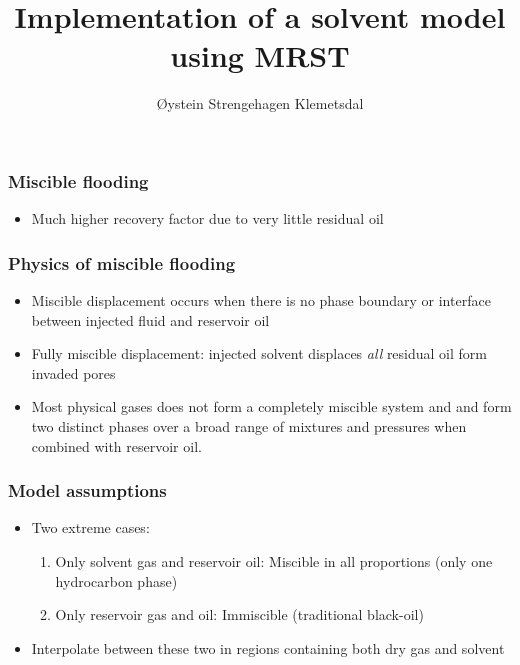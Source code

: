 \documentclass[screen, aspectratio=43]{beamer}
\title[Short title]{Implementation of a solvent model using MRST}
\author[Ø.S. Klemetsdal]{Øystein Strengehagen Klemetsdal}
\institute[NTNU]{Department of Mathematical sciences, NTNU}
\date{} %
\begin{document}
\ntnutitlepage

\begin{frame}
  \frametitle{Miscible flooding}
  \begin{itemize}
  \item Much higher recovery factor due to very little residual oil  
  \end{itemize}
\end{frame}

\begin{frame}
  \frametitle{Physics of miscible flooding}
  \begin{itemize}
  \item Miscible displacement occurs when there is no phase boundary or
    interface between injected fluid and reservoir oil
  \item Fully miscible displacement: injected solvent displaces \emph{all}
    residual oil form invaded pores
  \item Most physical gases does not form a completely miscible system and and
    form two distinct phases over a broad range of mixtures and pressures when
    combined with reservoir oil.
  \end{itemize}
\end{frame}

\begin{frame}
  \frametitle{Model assumptions}
  \begin{itemize}
  \item Two extreme cases:
    \begin{enumerate}
    \item Only solvent gas and reservoir oil: Miscible in all proportions (only
      one hydrocarbon phase)
    \item Only reservoir gas and oil: Immiscible (traditional black-oil)
    \end{enumerate}
  \item Interpolate between these two in regions containing both dry gas and
    solvent
  \end{itemize}
\end{frame}
\end{document}
